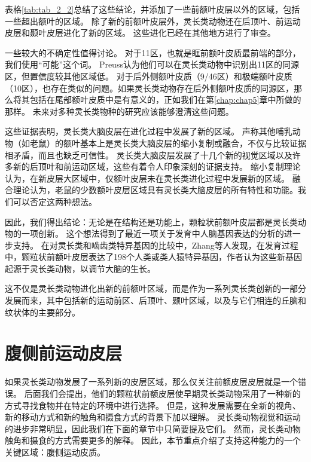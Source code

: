 表格\ref{tab:tab_2_2}总结了这些结论，并添加了一些前额叶皮层以外的区域，包括一些超出额叶的区域。
除了新的前额叶皮层外，灵长类动物还在后顶叶、前运动皮层和颞叶皮层进化了新的区域。
这些进化已经在其他地方进行了审查\cite{kaas2020evolution,preuss2007primate}。


一些较大的不确定性值得讨论。
对于11区，也就是眶前额叶皮质最前端的部分，我们使用“可能”这个词。
Preuss\cite{preuss1991myelo}认为他们可以在灵长类动物中识别出11区的同源区，但置信度较其他区域低。
对于后外侧额叶皮质（9/46区）和极端额叶皮质（10区），也存在类似的问题。如果灵长类动物存在后外侧额叶皮质的同源区，那么将其包括在尾部额叶皮质中是有意义的，正如我们在第\ref{chap:chap5}章中所做的那样。
未来对多种灵长类物种的研究应该能够澄清这些问题。


这些证据表明，灵长类大脑皮层在进化过程中发展了新的区域。
声称其他哺乳动物（如老鼠）的额叶基本上是灵长类大脑皮层的缩小复制或融合，不仅与比较证据相矛盾，而且也缺乏可信性。
灵长类大脑皮层发展了十几个新的视觉区域以及许多新的后顶叶和前运动区域，这些有着令人印象深刻的证据支持。
缩小复制理论认为，在新皮层大区域中，仅额叶皮层未在灵长类进化过程中发展新的区域。
融合理论认为，老鼠的少数额叶皮层区域具有灵长类大脑皮层的所有特性和功能。我们可以否定这两种想法。


因此，我们得出结论：无论是在结构还是功能上，颗粒状前额叶皮层都是灵长类动物的一项创新。
这个想法得到了最近一项关于发育中人脑基因表达的分析的进一步支持。
在对灵长类和啮齿类特异基因的比较中，Zhang等人\cite{zhang2011accelerated}发现，在发育过程中，颗粒状前额叶皮层表达了198个人类或类人猿特异基因，作者认为这些新基因起源于灵长类动物，以调节大脑的生长。


这不仅是灵长类动物进化出新的前额叶区域，而是作为一系列灵长类创新的一部分发展而来，其中包括新的运动前区、后顶叶、颞叶区域，以及与它们相连的丘脑和纹状体的主要部分\cite{preuss2007evolutionary,preuss2007primate}。



\section{腹侧前运动皮层}

如果灵长类动物发展了一系列新的皮层区域，那么仅关注前额皮层皮层就是一个错误。
后面我们会提出，他们的颗粒状前额皮层使早期灵长类动物采用了一种新的方式寻找食物并在特定的环境中进行选择。
但是，这种发展需要在全新的视角、新的移动方式和新的触角和摄食方式的背景下加以理解。
灵长类动物视觉和运动的进步非常明显，因此我们在下面的章节中只简要提及它们。
然而，灵长类动物触角和摄食的方式需要更多的解释。
因此，本节重点介绍了支持这种能力的一个关键区域：腹侧运动皮质。


